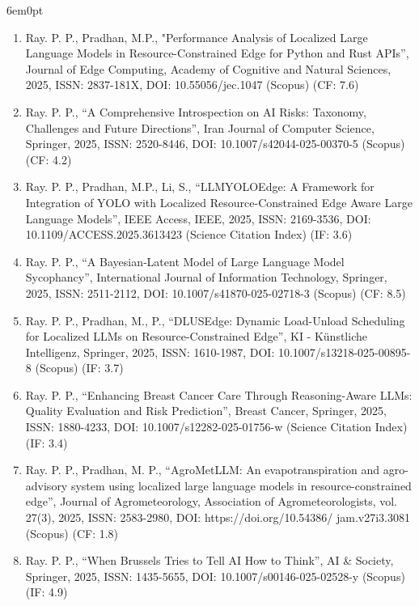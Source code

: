 \documentclass[11pt,a4paper]{moderncv}
\begin{document}
\begin{adjustwidth}{6em}{0pt}
\begin{enumerate}
		\item Ray. P. P., Pradhan, M.P., "Performance Analysis of Localized Large Language Models in Resource-Constrained Edge for Python and Rust APIs”, Journal of Edge Computing, Academy of Cognitive and Natural Sciences, 2025, ISSN: 2837-181X, DOI: 10.55056/jec.1047 (Scopus) (CF: 7.6) 
		
		\item Ray. P. P., “A Comprehensive Introspection on AI Risks: Taxonomy, Challenges and Future Directions”, Iran Journal of Computer Science, Springer, 2025, ISSN: 2520-8446, DOI: 10.1007/s42044-025-00370-5 (Scopus) (CF: 4.2)
		
		
		\item Ray. P. P., Pradhan, M.P., Li, S., “LLMYOLOEdge: A Framework for Integration of YOLO with Localized Resource-Constrained Edge Aware Large Language Models”, IEEE Access, IEEE, 2025, ISSN: 2169-3536, DOI: 10.1109/ACCESS.2025.3613423 (Science Citation Index) (IF: 3.6)
		
		\item Ray. P. P., “A Bayesian‐Latent Model of Large Language Model Sycophancy”, International Journal of Information Technology, Springer, 2025, ISSN: 2511-2112, DOI: 10.1007/s41870-025-02718-3 (Scopus) (CF: 8.5)
		
		\item Ray. P. P., Pradhan, M., P., “DLUSEdge: Dynamic Load-Unload Scheduling for Localized LLMs on Resource-Constrained Edge”, KI - Künstliche Intelligenz, Springer, 2025, ISSN: 1610-1987, DOI: 10.1007/s13218-025-00895-8 (Scopus) (IF: 3.7) 
	
		\item Ray. P. P., “Enhancing Breast Cancer Care Through Reasoning-Aware LLMs: Quality Evaluation and Risk Prediction”, Breast Cancer, Springer, 2025, ISSN: 1880-4233, DOI: 10.1007/s12282-025-01756-w (Science Citation Index) (IF: 3.4) 
		
				
		\item Ray. P. P., Pradhan, M. P., “AgroMetLLM: An evapotranspiration and agro-advisory system using localized large language models in resource-constrained edge”, Journal of Agrometeorology, Association of Agrometeorologists, vol. 27(3), 2025, ISSN: 2583-2980, DOI: https://doi.org/10.54386/ jam.v27i3.3081 (Scopus) (CF: 1.8)
		
		\item Ray. P. P., “When Brussels Tries to Tell AI How to Think”, AI \& Society, Springer, 2025, ISSN: 1435-5655, DOI: 10.1007/s00146-025-02528-y (Scopus) (IF: 4.9) 
		

\end{enumerate}
\end{adjustwidth}
\end{document}
